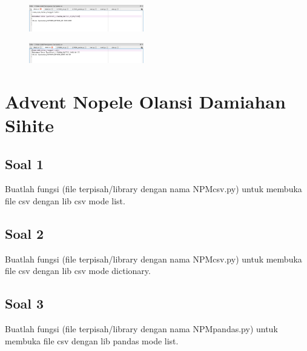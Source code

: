 \begin{figure}[H]
 \includegraphics[width=5cm]{figures/4/1174084/Praktek/c4_5.png}
 \centering
\end{figure}

\begin{figure}[H]
 \includegraphics[width=5cm]{figures/4/1174084/Praktek/c4_6.png}
 \centering
\end{figure}

\section{Advent Nopele Olansi Damiahan Sihite}
\subsection{Soal 1}
Buatlah  fungsi  (file  terpisah/library  dengan  nama  NPMcsv.py)  untuk  membuka file csv dengan lib csv mode list.



\subsection{Soal 2}
Buatlah  fungsi  (file  terpisah/library  dengan  nama  NPMcsv.py)  untuk  membuka file csv dengan lib csv mode dictionary.



\subsection{Soal 3}
Buatlah fungsi (file terpisah/library dengan nama NPMpandas.py) untuk membuka file csv dengan lib pandas mode list.



